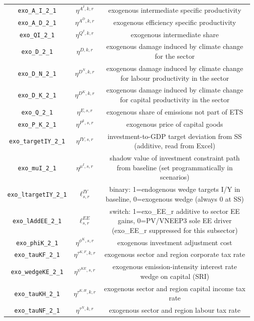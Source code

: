 \begin{center}
\begin{longtable}{ccc}
\texttt{exo\_A\_I\_2\_1} & ${\eta^{A^{I},k,r}}$ & exogenous intermediate specific productivity\\
\texttt{exo\_A\_D\_2\_1} & ${\eta^{A^{D},k,r}}$ & exogenous efficiency specific productivity\\
\texttt{exo\_QI\_2\_1} & ${\eta^{Q^{I},k,r}}$ & exogenous intermediate share\\
\texttt{exo\_D\_2\_1} & ${\eta^{D,k,r}}$ & exogenous damage induced by climate change for the sector\\
\texttt{exo\_D\_N\_2\_1} & ${\eta^{D^{N},k,r}}$ & exogenous damage induced by climate change for labour productivity in the sector\\
\texttt{exo\_D\_K\_2\_1} & ${\eta^{D^{K},k,r}}$ & exogenous damage induced by climate change for capital productivity in the sector\\
\texttt{exo\_Q\_2\_1} & ${\eta^{E,s,r}}$ & exogenous share of emissions not part of ETS\\
\texttt{exo\_P\_K\_2\_1} & ${\eta^{P^k,s,r}}$ & exogenous price of capital goods\\
\texttt{exo\_targetIY\_2\_1} & ${\eta^{IY,s,r}}$ & investment-to-GDP target deviation from SS (additive, read from Excel)\\
\texttt{exo\_muI\_2\_1} & ${\eta^{\mu^{I},s,r}}$ & shadow value of investment constraint path from baseline (set programmatically in scenarios)\\
\texttt{exo\_ltargetIY\_2\_1} & ${\ell^{IY}_{s,r}}$ & binary: 1=endogenous wedge targets I/Y in baseline, 0=exogenous wedge (always 0 at SS)\\
\texttt{exo\_lAddEE\_2\_1} & ${\ell^{EE}_{s,r}}$ & switch: 1=exo\_EE\_r additive to sector EE gains, 0=PV/VNEEP3 sole EE driver (exo\_EE\_r suppressed for this subsector)\\
\texttt{exo\_phiK\_2\_1} & ${\eta^{\phi^{K},{s,r}}}$ & exogenous investment adjustment cost\\
\texttt{exo\_tauKF\_2\_1} & ${\eta^{\tau^{K,F},k,r}}$ & exogenous sector and region corporate tax rate\\
\texttt{exo\_wedgeKE\_2\_1} & ${\eta^{\psi^{KE},s,r}}$ & exogenous emission-intensity interest rate wedge on capital (SRI)\\
\texttt{exo\_tauKH\_2\_1} & ${\eta^{\tau^{K,H},k,r}}$ & exogenous sector and region capital income tax rate\\
\texttt{exo\_tauNF\_2\_1} & ${\eta^{\tau^{N},k,r}}$ & exogenous sector and region labour tax rate\\

\end{longtable}
\end{center}
